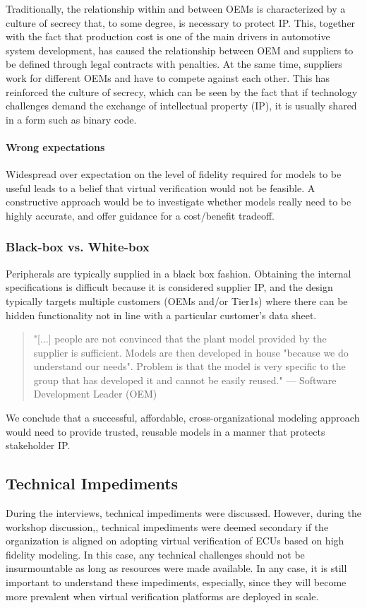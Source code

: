 Traditionally, the relationship within and between OEMs is characterized by a culture of secrecy that, to some degree, is necessary to protect IP. This, together with the fact that production cost is one of the main drivers in automotive system development, has caused the relationship between OEM and suppliers to be defined through legal contracts with penalties. At the same time, suppliers work for different OEMs and have to compete against each other. This has reinforced the culture of secrecy, which can be seen by the fact that if technology challenges demand the exchange of intellectual property (IP), it is usually shared in a form such as binary code.

\paragraph{Wrong expectations}
Widespread over expectation on the level of fidelity required for models to be useful leads to a belief that virtual verification would not be feasible. A constructive approach would be to investigate whether models really need to be highly accurate, and offer guidance for a cost/benefit tradeoff.

\subsubsection{Black-box vs. White-box}
Peripherals are typically supplied in a black box fashion. Obtaining the internal specifications is difficult because it is considered supplier IP, and the design typically targets multiple customers (OEMs and/or Tier1s) where there can be hidden functionality not in line with a particular customer’s data sheet.

\begin{quote}
"[...] people are not convinced that the plant model provided by the supplier is sufficient. Models are then developed in house "because we do understand our needs". Problem is that the model is very specific to the group that has developed it and cannot be easily reused." 
— Software Development Leader (OEM)
\end{quote}
We conclude that a successful, affordable, cross-organizational modeling approach would need to provide trusted, reusable models in a manner that protects stakeholder IP.

\subsection{Technical Impediments}
During the interviews, technical impediments were discussed. However, during the workshop discussion,, technical impediments were deemed secondary if the organization is aligned on adopting virtual verification of ECUs based on high fidelity modeling. In this case, any technical challenges should not be insurmountable as long as resources were made available. In any case, it is still important to understand these impediments, especially, since they will become more prevalent when virtual verification platforms are deployed in scale.

